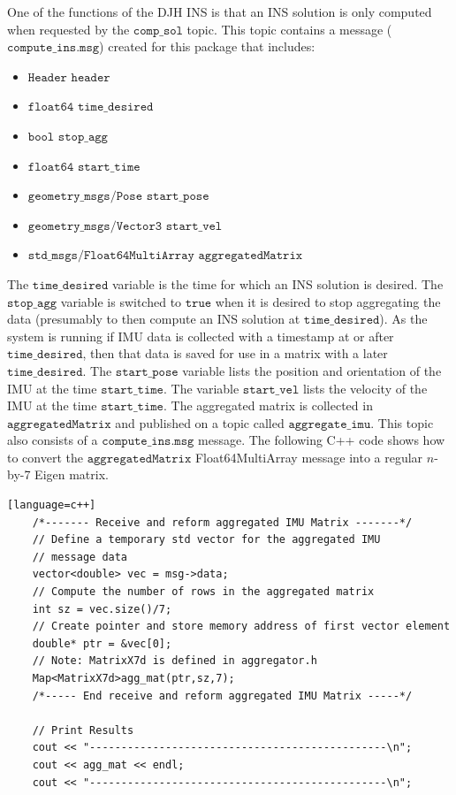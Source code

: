 \documentclass[11pt,a4paper]{article}
\begin{document}
One of the functions of the DJH INS is that an INS solution is only computed when requested by the $\texttt{comp\_sol}$ topic. This topic contains a message ($\texttt{compute\_ins.msg}$) created for this package that includes:
\begin{itemize}
	\item $\texttt{Header	header}$
	\item $\texttt{float64	time\_desired}$
	\item $\texttt{bool		stop\_agg}$
	\item $\texttt{float64	start\_time}$
	\item $\texttt{geometry\_msgs/Pose	start\_pose}$
	\item $\texttt{geometry\_msgs/Vector3	start\_vel}$
	\item $\texttt{std\_msgs/Float64MultiArray	aggregatedMatrix}$
\end{itemize}
The $\texttt{time\_desired}$ variable is the time for which an INS solution is desired. The $\texttt{stop\_agg}$ variable is switched to $\texttt{true}$ when it is desired to stop aggregating the data (presumably to then compute an INS solution at $\texttt{time\_desired}$). As the system is running if IMU data is collected with a timestamp at or after $\texttt{time\_desired}$, then that data is saved for use in a matrix with a later $\texttt{time\_desired}$. The $\texttt{start\_pose}$ variable lists the position and orientation of the IMU at the time $\texttt{start\_time}$. The variable $\texttt{start\_vel}$ lists the velocity of the IMU at the time $\texttt{start\_time}$. The aggregated matrix is collected in $\texttt{aggregatedMatrix}$ and published on a topic called $\texttt{aggregate\_imu}$. This topic also consists of a $\texttt{compute\_ins.msg}$ message. The following C++ code shows how to convert the $\texttt{aggregatedMatrix}$ Float64MultiArray message into a regular $n$-by-7 Eigen matrix.
\begin{lstlisting}[frame=single,breaklines] [language=c++]
    /*------- Receive and reform aggregated IMU Matrix -------*/
    // Define a temporary std vector for the aggregated IMU 
    // message data
    vector<double> vec = msg->data;
    // Compute the number of rows in the aggregated matrix
    int sz = vec.size()/7;
    // Create pointer and store memory address of first vector element
    double* ptr = &vec[0];
    // Note: MatrixX7d is defined in aggregator.h
    Map<MatrixX7d>agg_mat(ptr,sz,7);
    /*----- End receive and reform aggregated IMU Matrix -----*/

    // Print Results
    cout << "-----------------------------------------------\n";
    cout << agg_mat << endl;
    cout << "-----------------------------------------------\n";
\end{lstlisting}
\end{document}
